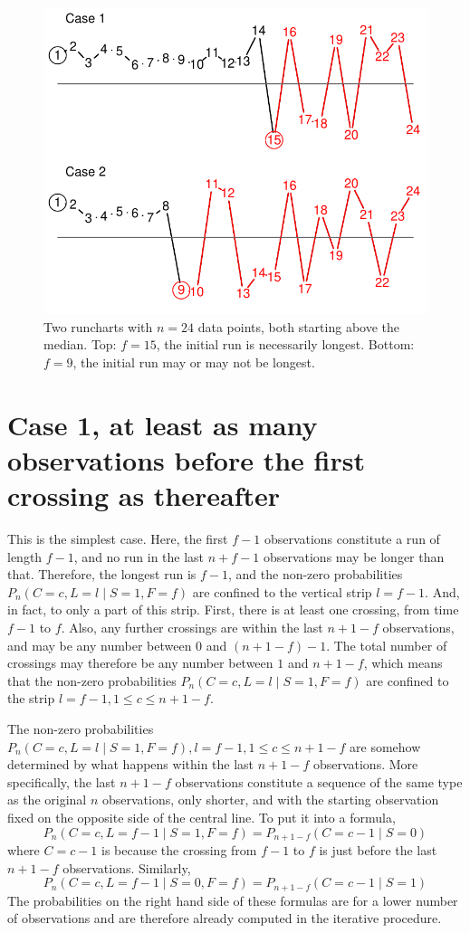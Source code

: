 \begin{figure}[htbp]
  \centering
  \caption{Two runcharts with $n=24$ data points, both starting above the median. Top: $f=15$, the initial run is necessarily longest. Bottom: $f=9$, the initial run may or may not be longest.}
  \label{figure:fig2}
  \includegraphics{fig2}
\end{figure}


\section{Case 1, at least as many observations before the first crossing as thereafter}

This is the simplest case. Here, the first $f-1$ observations constitute a run of length $f-1$, and no run in the last $n+f-1$ observations may be longer than that. Therefore, the longest run is $f-1$, and the non-zero probabilities $P_n (C=c,L=l \mid S=1,F=f)$ are confined to the vertical strip $l=f-1$. And, in fact, to only a part of this strip. First, there is at least one crossing, from time $f-1$ to $f$. Also, any further crossings are within the last $n+1-f$ observations, and may be any number between $0$ and $(n+1-f) - 1$. The total number of crossings may therefore be any number between $1$ and $n+1-f$, which means that the non-zero probabilities $P_n (C=c,L=l \mid S=1,F=f)$ are confined to the strip $l=f-1, 1 \leq c \leq n+1-f$. 

The non-zero probabilities $P_n (C=c,L=l \mid S=1,F=f), l=f-1, 1 \leq c \leq n+1-f$ are somehow determined by what happens within the last $n+1-f$ observations. More specifically, the last $n+1-f$ observations constitute a sequence of the same type as the original $n$ observations, only shorter, and with the starting observation fixed on the opposite side of the central line. To put it into a formula, $$P_n (C=c,L=f-1 \mid S=1,F=f)=P_{n+1-f} (C=c-1 \mid S=0)$$ where $C=c-1$ is because the crossing from $f-1$ to $f$ is just before the last $n+1-f$ observations. Similarly, $$P_n (C=c,L=f-1 \mid S=0,F=f)=P_{n+1-f} (C=c-1 \mid S=1)$$ The probabilities on the right hand side of these formulas are for a lower number of observations and are therefore already computed in the iterative procedure. 

